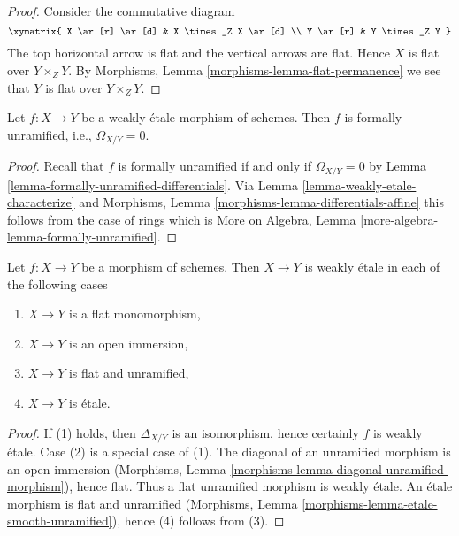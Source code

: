 \begin{proof}
Consider the commutative diagram
$$
\xymatrix{
X \ar[r] \ar[d] & X \times_Z X \ar[d] \\
Y \ar[r] & Y \times_Z Y
}
$$
The top horizontal arrow is flat and the vertical arrows are flat.
Hence $X$ is flat over $Y \times_Z Y$. By
Morphisms, Lemma \ref{morphisms-lemma-flat-permanence}
we see that $Y$ is flat over $Y \times_Z Y$.
\end{proof}

\begin{lemma}
\label{lemma-weakly-etale-formally-unramified}
Let $f : X \to Y$ be a weakly \'etale morphism of schemes.
Then $f$ is formally unramified, i.e., $\Omega_{X/Y} = 0$.
\end{lemma}

\begin{proof}
Recall that $f$ is formally unramified if and only if $\Omega_{X/Y} = 0$ by
Lemma \ref{lemma-formally-unramified-differentials}.
Via Lemma \ref{lemma-weakly-etale-characterize} and
Morphisms, Lemma \ref{morphisms-lemma-differentials-affine}
this follows from the case of rings which is
More on Algebra, Lemma \ref{more-algebra-lemma-formally-unramified}.
\end{proof}

\begin{lemma}
\label{lemma-when-weakly-etale}
Let $f : X \to Y$ be a morphism of schemes. Then $X \to Y$ is weakly \'etale
in each of the following cases
\begin{enumerate}
\item $X \to Y$ is a flat monomorphism,
\item $X \to Y$ is an open immersion,
\item $X \to Y$ is flat and unramified,
\item $X \to Y$ is \'etale.
\end{enumerate}
\end{lemma}

\begin{proof}
If (1) holds, then $\Delta_{X/Y}$ is an isomorphism, hence certainly
$f$ is weakly \'etale. Case (2) is a special case of (1).
The diagonal of an unramified morphism is an open immersion
(Morphisms, Lemma \ref{morphisms-lemma-diagonal-unramified-morphism}),
hence flat. Thus a flat unramified morphism is weakly \'etale.
An \'etale morphism is flat and unramified
(Morphisms, Lemma \ref{morphisms-lemma-etale-smooth-unramified}),
hence (4) follows from (3).
\end{proof}

